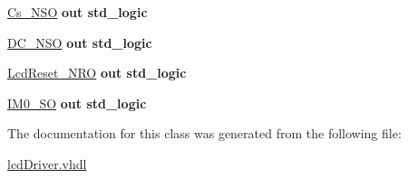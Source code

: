 \begin{DoxyCompactItemize}
\item 
\mbox{\label{classLcdDriver_ad7d8ed8b658f475fe5794db14cbf4756}} 
\hyperlink{classLcdDriver_ad7d8ed8b658f475fe5794db14cbf4756}{Cs\+\_\+\+N\+SO}  {\bfseries {\bfseries \textcolor{vhdlchar}{out}\textcolor{vhdlchar}{ }}} {\bfseries \textcolor{vhdlchar}{std\+\_\+logic}\textcolor{vhdlchar}{ }} 
\item 
\mbox{\label{classLcdDriver_a03ca52f19c4fbcc08c96833ffbbb8446}} 
\hyperlink{classLcdDriver_a03ca52f19c4fbcc08c96833ffbbb8446}{D\+C\+\_\+\+N\+SO}  {\bfseries {\bfseries \textcolor{vhdlchar}{out}\textcolor{vhdlchar}{ }}} {\bfseries \textcolor{vhdlchar}{std\+\_\+logic}\textcolor{vhdlchar}{ }} 
\item 
\mbox{\label{classLcdDriver_a6e8b56885d3957111538a162097f51c1}} 
\hyperlink{classLcdDriver_a6e8b56885d3957111538a162097f51c1}{Lcd\+Reset\+\_\+\+N\+RO}  {\bfseries {\bfseries \textcolor{vhdlchar}{out}\textcolor{vhdlchar}{ }}} {\bfseries \textcolor{vhdlchar}{std\+\_\+logic}\textcolor{vhdlchar}{ }} 
\item 
\mbox{\label{classLcdDriver_a80c9d9678961bd65ade48155e55345b8}} 
\hyperlink{classLcdDriver_a80c9d9678961bd65ade48155e55345b8}{I\+M0\+\_\+\+SO}  {\bfseries {\bfseries \textcolor{vhdlchar}{out}\textcolor{vhdlchar}{ }}} {\bfseries \textcolor{vhdlchar}{std\+\_\+logic}\textcolor{vhdlchar}{ }} 
\end{DoxyCompactItemize}


The documentation for this class was generated from the following file\+:\begin{DoxyCompactItemize}
\item 
\hyperlink{lcdDriver_8vhdl}{lcd\+Driver.\+vhdl}\end{DoxyCompactItemize}
